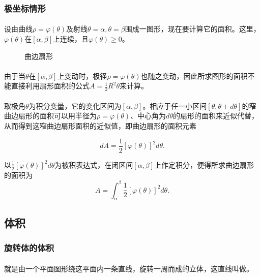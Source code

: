 \subsubsection{极坐标情形}
\paragraph{}

设由曲线$\rho=\varphi(\theta)$及射线$\theta=\alpha, \theta=\beta$围成一图形，现在要计算它的面积。这里，$\varphi(\theta)$在$[\alpha,\beta]$上连续，且$\varphi(\theta) \geq 0$。

\begin{figure}[H]
\centering
  
  \caption{曲边扇形}
\end{figure}

\paragraph{}
由于当$\theta$在$[\alpha,\beta]$上变动时，极径$\rho=\varphi(\theta)$也随之变动，因此所求图形的面积不能直接利用扇形面积的公式$\displaystyle A=\frac{1}{2}R^2\theta$来计算。

\paragraph{}
取极角$\theta$为积分变量，它的变化区间为$[\alpha,\beta]$。相应于任一小区间$[\theta, \theta+d\theta]$的窄曲边扇形的面积可以用半径为$\rho=\varphi(\theta)$、中心角为$d\theta$的扇形的面积来近似代替，从而得到这窄曲边扇形面积的近似值，即曲边扇形的面积元素

\begin{equation*}
  dA = \frac{1}{2}[\varphi(\theta)]^2d\theta.
\end{equation*}

以$\displaystyle\frac{1}{2}[\varphi(\theta)]^2d\theta$为被积表达式，在闭区间$[\alpha,\beta]$上作定积分，便得所求曲边扇形的面积为
\begin{equation*}
  A = \int_\alpha^\beta\frac{1}{2}[\varphi(\theta)]^2d\theta.
\end{equation*}

\subsection{体积}
\subsubsection{旋转体的体积}
\paragraph{}
就是由一个平面图形绕这平面内一条直线，旋转一周而成的立体，这直线叫做。

